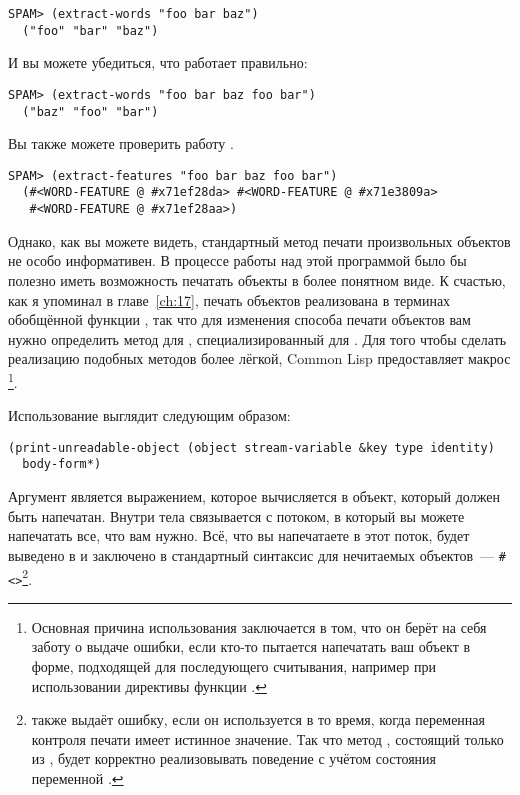 \begin{lstlisting}[style=lisprepl]
  SPAM> (extract-words "foo bar baz")
  ("foo" "bar" "baz")
\end{lstlisting}

И вы можете убедиться, что  работает правильно:

\begin{lstlisting}[style=lisprepl]
  SPAM> (extract-words "foo bar baz foo bar")
  ("baz" "foo" "bar")
\end{lstlisting}

Вы также можете проверить работу .

\begin{lstlisting}[style=lisprepl]
  SPAM> (extract-features "foo bar baz foo bar")
  (#<WORD-FEATURE @ #x71ef28da> #<WORD-FEATURE @ #x71e3809a>
   #<WORD-FEATURE @ #x71ef28aa>)
\end{lstlisting}

Однако, как вы можете видеть, стандартный метод печати произвольных объектов не особо
информативен.  В процессе работы над этой программой было бы полезно иметь возможность
печатать объекты  в более понятном виде.  К счастью, как я упоминал в
главе~\ref{ch:17}, печать объектов реализована в терминах обобщённой функции
, так что для изменения способа печати объектов  вам
нужно определить метод для , специализированный для
.  Для того чтобы сделать реализацию подобных методов более лёгкой,
Common Lisp предоставляет макрос \footnote{Основная причина
  использования  заключается в том, что он берёт на себя
  заботу о выдаче ошибки, если кто-то пытается напечатать ваш объект в форме, подходящей
  для последующего считывания, например при использовании директивы  функции
  .}.

Использование  выглядит следующим образом:

\begin{lstlisting}
(print-unreadable-object (object stream-variable &key type identity)
  body-form*)
\end{lstlisting}

Аргумент  является выражением, которое вычисляется в объект, который должен
быть напечатан.  Внутри тела  
связывается с потоком, в который вы можете напечатать все, что вам нужно. Всё, что вы
на\-пе\-ча\-тае\-те в этот поток, будет выведено в  и заключено в
стандартный синтаксис для нечитаемых объектов~---
\lstinline!#<>!\footnote{ также выдаёт ошибку, если он
  используется в то время, когда переменная контроля печати  имеет
  истинное значение.  Так что метод , состоящий только из
  , будет корректно реализовывать поведение
   с учётом состояния переменной .}.

